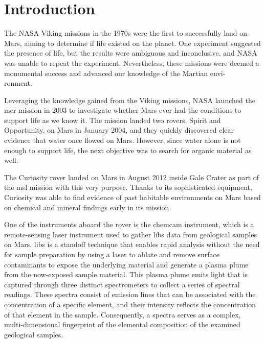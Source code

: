 \section{Introduction}\label{sec:introduction}
The NASA Viking missions in the 1970s were the first to successfully land on Mars, aiming to determine if life existed on the planet.
One experiment suggested the presence of life, but the results were ambiguous and inconclusive, and NASA was unable to repeat the experiment.
Nevertheless, these missions were deemed a monumental success and advanced our knowledge of the Martian envi-\\ronment.\cite{marsnasagov_vikings}

Leveraging the knowledge gained from the Viking missions, NASA launched the \gls{mer} mission in 2003 to investigate whether Mars ever had the conditions to support life as we know it.
The mission landed two rovers, Spirit and Opportunity, on Mars in January 2004, and they quickly discovered clear evidence that water once flowed on Mars.
However, since water alone is not enough to support life, the next objective was to search for organic material as well.\cite{marsnasagov_observer, marsnasagov_spirit_opportunity}

The Curiosity rover landed on Mars in August 2012 inside Gale Crater as part of the \gls{msl} mission with this very purpose.
Thanks to its sophisticated equipment, Curiosity was able to find evidence of past habitable environments on Mars based on chemical and mineral findings early in its mission.\cite{marsnasagov_chemcam}

One of the instruments aboard the rover is the \gls{chemcam} instrument, which is a remote-sensing laser instrument used to gather \gls{libs} data from geological samples on Mars.
\gls{libs} is a standoff technique that enables rapid analysis without the need for sample preparation by using a laser to ablate and remove surface contaminants to expose the underlying material and generate a plasma plume from the now-exposed sample material\cite{wiensChemcam2012}.
This plasma plume emits light that is captured through three distinct spectrometers to collect a series of spectral readings.
These spectra consist of emission lines that can be associated with the concentration of a specific element, and their intensity reflects the concentration of that element in the sample.
Consequently, a spectra serves as a complex, multi-dimensional fingerprint of the elemental composition of the examined geological samples.\cite{cleggRecalibrationMarsScience2017}

